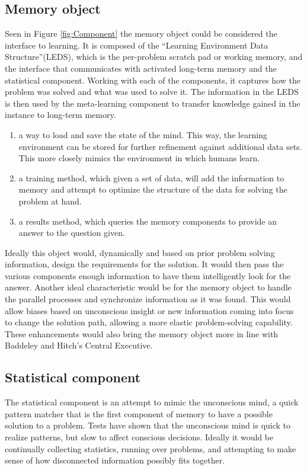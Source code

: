 \subsection{Memory object} 

Seen in Figure \ref{fig:Component} the memory object could be considered the interface to learning. It is composed of the 
``Learning Environment Data Structure''(LEDS), which is the per-problem scratch pad or working memory, 
and the interface that communicates with activated long-term memory and the statistical component. 
Working with each of the components, it captures how the problem was solved and what was used to solve it.  
The information in the LEDS is then used by the meta-learning component to transfer knowledge gained 
in the instance to long-term memory.

\begin{enumerate}     
	\item a way to load and save the state of the mind. This way, the learning
	environment can be stored for further refinement against 
	additional data sets. This more closely mimics the environment in which 
	humans learn.
	\item a training method, which given a set of data, will add the
	information to memory and attempt to optimize the structure of the data 
	for solving the problem at hand.
	\item a results method, which queries the memory components to provide an answer
	to the question given.
\end{enumerate}

Ideally this object would, dynamically
and based on prior problem solving information, design the requirements for the
solution. It would then pass the various components enough information to have
them intelligently look for the answer.  Another ideal characteristic would be
for the memory object to handle the parallel processes and synchronize
information as it was found.  This would allow biases based on unconscious
insight or new information coming into focus to change the solution path,
allowing a more elastic problem-solving capability.  These enhancements would
also bring the memory object more in line with Baddeley and Hitch's Central Executive.

\subsection{Statistical component} 

The statistical component is an attempt to
mimic the unconscious mind, a quick pattern matcher that is the first
component of memory to have a possible solution to a problem.  Tests have shown
\cite{BLINK} that the unconscious mind is quick to realize patterns, but slow to
affect conscious decisions. Ideally it would be continually collecting
statistics, running over problems, and attempting to make sense of how
disconnected information possibly fits together.

